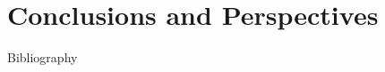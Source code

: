 \documentclass[A4,svgnames,9pt,aspectratio=169]{beamer}
\begin{document}
\section{Conclusions and Perspectives}
\frame{\sectionpage}



\begin{frame}[allowframebreaks]{Bibliography}
\printbibliography[]
\nocite{*}
\end{frame}







\renewcommand{\thankyou}{Thank You.}
\frame{\merci}

\end{document}
